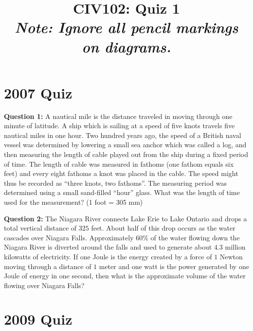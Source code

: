 \documentclass{article}
\title{CIV102: Quiz 1 \\ \textit{Note: Ignore all pencil markings on diagrams.}}
\author{}
\date{}
\begin{document}
\maketitle
\section*{2007 Quiz}
\textbf{Question 1:} A nautical mile is the distance traveled in moving through one minute of latitude. A ship which is sailing at a speed of five knots travels five nautical miles in one hour. Two hundred years ago, the speed of a British naval vessel was determined by lowering a small sea anchor which was called a log, and then measuring the length of cable played out from the ship during a fixed period of time. The length of cable was measured in fathoms (one fathom equals six feet) and every eight fathoms a knot was placed in the cable. The speed might thus be recorded as ``three knots, two fathoms''. The measuring period was determined using a small sand-filled ``hour'' glass. What was the length of time used for the measurement? (1 foot = 305 mm)

\textbf{Question 2:} The Niagara River connects Lake Erie to Lake Ontario and drops a total vertical distance of $325$ feet. About half of this drop occurs as the water cascades over Niagara Falls. Approximately $60\%$ of the water flowing down the Niagara River is diverted around the falls and used to generate about $4.3$ million kilowatts of electricity. If one Joule is the energy created by a force of $1$ Newton moving through a distance of $1$ meter and one watt is the power generated by one Joule of energy in one second, then what is the approximate volume of the water flowing over Niagara Falls?

\newpage
\section*{2009 Quiz}
\end{document}
